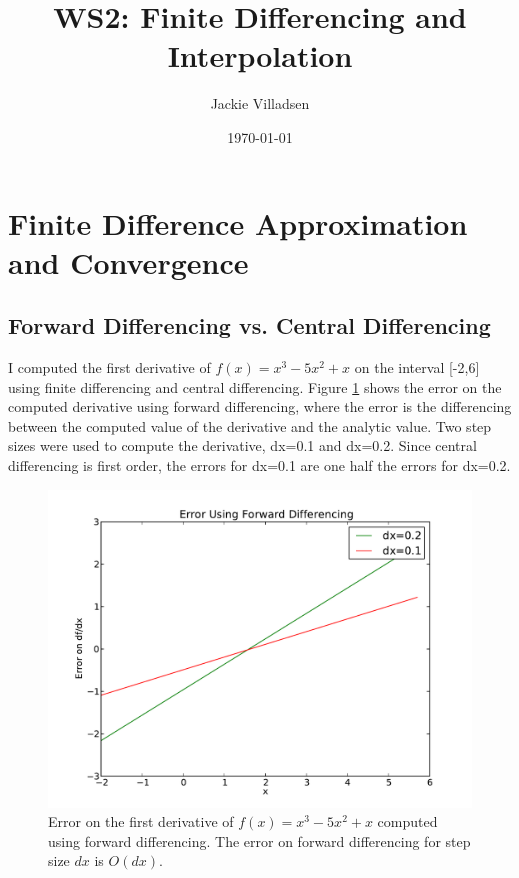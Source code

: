 \documentclass{article}
\begin{document}
\title{WS2: Finite Differencing and Interpolation}
\author{Jackie Villadsen}
\date{\today}
\maketitle


\section{Finite Difference Approximation and Convergence}
\subsection{Forward Differencing vs. Central Differencing}
I computed the first derivative of $f(x)=x^3-5x^2+x$ on the interval
[-2,6] using finite differencing and central differencing.
Figure \ref{fig:fwd} shows the error on the computed derivative using
forward differencing, where the error is the differencing between the
computed value of the derivative and the analytic value.  Two step sizes
were used to compute the derivative, dx=0.1 and dx=0.2.  Since central
differencing is first order, the errors for dx=0.1 are one half the errors
for dx=0.2.
\begin{figure}[h]
  \begin{center}
     \includegraphics[width=\textwidth]{fwd}
  \end{center}
\caption{Error on the first derivative of $f(x)=x^3-5x^2+x$ computed
	 using forward differencing. The error on forward differencing
	 for step size $dx$ is $O(dx)$.}
  \label{fig:fwd}
\end{figure}
\end{document}
